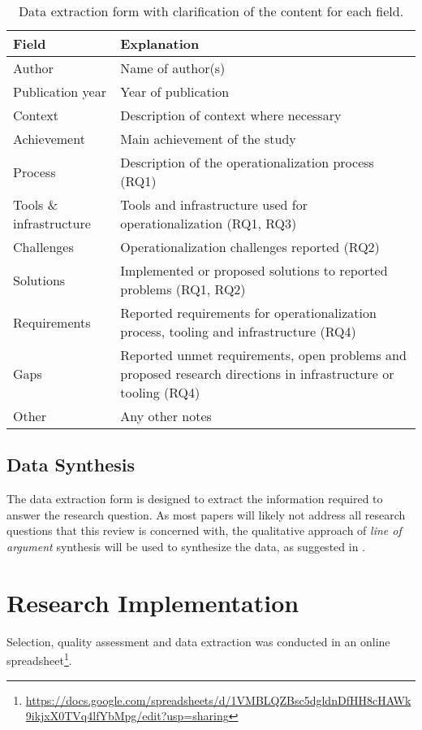 \begin{table}[]
    \centering
    \begin{tabular}{l|p{8.5cm}}
        Field & Explanation\\
        \hline
        Author & Name of author(s)  \\
        Publication year & Year of publication \\
        Context & Description of context where necessary \\
        Achievement & Main achievement of the study \\
        Process & Description of the operationalization process (RQ1) \\
        Tools \& infrastructure & Tools and infrastructure used for operationalization (RQ1, RQ3) \\
        Challenges & Operationalization challenges reported (RQ2) \\
        Solutions & Implemented or proposed solutions to reported problems (RQ1, RQ2) \\
        Requirements & Reported requirements for operationalization process, tooling and infrastructure (RQ4) \\
        Gaps & Reported unmet requirements, open problems and proposed research directions in infrastructure or tooling  (RQ4) \\
        Other & Any other notes \\
    \end{tabular}
    \caption{Data extraction form with clarification of the content for each field.}
    \label{tab:data_extraction_form}
\end{table}

\subsection{Data Synthesis}
The data extraction form is designed to extract the information required to answer the research question.
As most papers will likely not address all research questions that this review is concerned with, the qualitative approach of \textit{line of argument} synthesis will be used to synthesize the data, as suggested in \cite{Kitchenham07guidelinesfor}.

\section{Research Implementation}
\label{sec:research_implementation}
Selection, quality assessment and data extraction was conducted in an online spreadsheet\footnote{\url{https://docs.google.com/spreadsheets/d/1VMBLQZBsc5dgldnDfHH8cHAWk9ikjxX0TVq4lfYbMpg/edit?usp=sharing}}.

